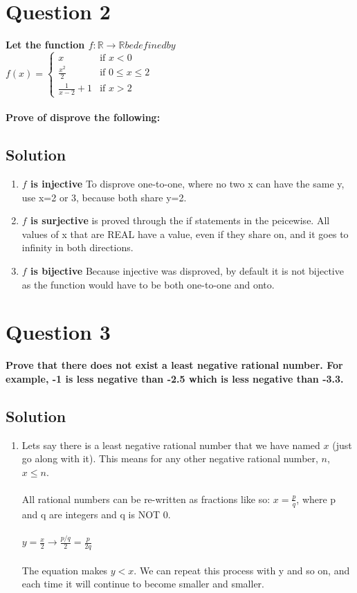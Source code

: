 \documentclass[11pt]{article}
\begin{document}
\clearpage
\section*{Question 2}
    \textbf{Let the function \(f: \mathbb{R} \rightarrow \mathbb{R} be defined by\) \\
    \(f(x) = \begin{cases}
        x & \text{if } x <0 \\
        \frac{x^2}{2} & \text{if } 0 \leq x \leq 2 \\
        \frac{1}{x-2}+1 & \text{if } x> 2
    \end{cases}\) \\ \\
    Prove of disprove the following:}
    \subsection*{Solution}
    \begin{enumerate}[label=(\alph*)]
        \item \textbf{\(f\) is injective} To disprove one-to-one, where no two x can have the same y, use x=2 or 3, because both share y=2.
        \item \textbf{\(f\) is surjective} is proved through the if statements in the peicewise. All values of x that are REAL have a value, even if they share on, and it goes to infinity in both directions.
        \item \textbf{\(f\) is bijective} Because injective was disproved, by default it is not bijective as the function would have to be both one-to-one and onto. 
    \end{enumerate}

\clearpage
\section*{Question 3}
    \textbf{Prove that there does not exist a least negative rational number. For example, -1 is less negative than -2.5 which is less negative than -3.3.}
    \subsection*{Solution}
    \begin{enumerate}[label=(\alph*)]
        \item[] Lets say there is a least negative rational number that we have named \(x\) (just go along with it). This means for any other negative rational number, \(n\), \(x \leq n\). \\ \\
        All rational numbers can be re-written as fractions like so: \(x = \frac{p}{q}\), where p and q are integers and q is NOT 0.\\ \\
        \(y=\frac{x}{2} \rightarrow \frac{p/q}{2} = \frac{p}{2q} \) \\ \\
        The equation makes \(y < x\). We can repeat this process with y and so on, and each time it will continue to become smaller and smaller.
        
    \end{enumerate}
\end{document}
